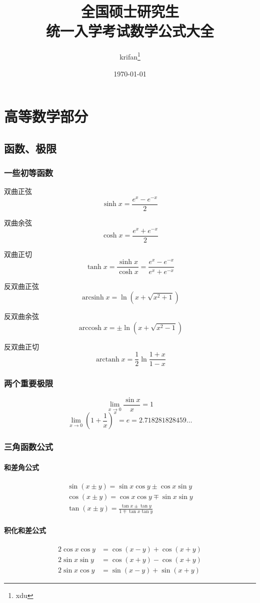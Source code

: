 \documentclass[a4paper,zihao=-4,UTF8]{ctexbook}
\title{\heiti 全国硕士研究生\\统一入学考试数学公式大全}
\author{krifan\thanks{xdu}}
\date{\small\today}
\begin{document}
\maketitle
{}
\tableofcontents
\newpage
{}
\chapter{高等数学部分}
\section{函数、极限}
\subsection{一些初等函数}
双曲正弦\[\sinh x=\frac{e^x-e^{-x}}{2}\]

双曲余弦\[\cosh x=\frac{e^x+e^{-x}}{2}\]

双曲正切\[\tanh x=\frac{\sinh x}{\cosh x}=\frac{e^x-e^{-x}}{e^x+e^{-x}}\]

反双曲正弦\[\operatorname{arcsinh} x=\ln\left(x+\sqrt{x^2+1}\right)\]

反双曲余弦\[\operatorname{arccosh} x=\pm\ln\left(x+\sqrt{x^2-1}\right)\]

反双曲正切\[\operatorname{arctanh} x=\frac12\ln\frac{1+x}{1-x}\]
\subsection{两个重要极限}
\[\lim_{x\to 0}\frac{\sin x}{x}=1\]
\[\lim_{x\to 0}(1+\frac 1x)^x=e=2.718281828459\ldots\]
\subsection{三角函数公式}
\subsubsection{和差角公式}
\begin{gather*}
    \sin(x\pm y)=\sin x\cos y\pm\cos x\sin y\\
\cos(x\pm y)=\cos x\cos y\mp\sin x\sin y\\
\tan(x\pm y)=\frac{\tan x\pm\tan y}{1\mp\tan x\tan y}
\end{gather*}
\subsubsection{积化和差公式}
\begin{align*}
    2\cos x \cos y &=\cos \left( x -y \right) +\cos \left( x +y \right) \\
    2\sin x \sin y &=\cos \left( x +y \right) -\cos \left( x +y \right) \\
    2\sin x \cos y &=\sin \left( x -y \right) +\sin \left( x +y \right) 
\end{align*}
\end{document}
